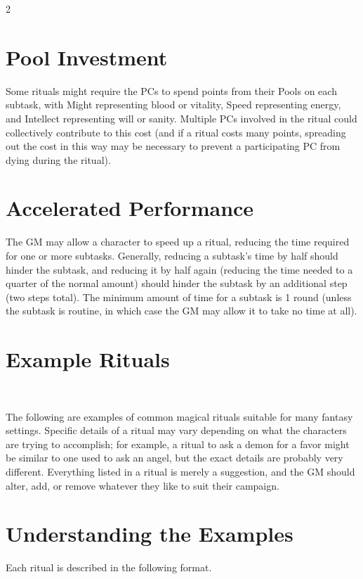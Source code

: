 \begin{multicols}{2}
\section{Pool Investment}

Some rituals might require the PCs to spend points from their Pools on each subtask, with Might representing blood or vitality, Speed representing energy, and Intellect representing will or sanity. Multiple PCs involved in the ritual could collectively contribute to this cost (and if a ritual costs many points, spreading out the cost in this way may be necessary to prevent a participating PC from dying during the ritual). 

\section{Accelerated Performance}

The GM may allow a character to speed up a ritual, reducing the time required for one or more subtasks. Generally, reducing a subtask’s time by half should hinder the subtask, and reducing it by half again (reducing the time needed to a quarter of the normal amount) should hinder the subtask by an additional step (two steps total). The minimum amount of time for a subtask is 1 round (unless the subtask is routine, in which case the GM may allow it to take no time at all).

\section{Example Rituals} 

The following are examples of common magical rituals suitable for many fantasy settings. Specific details of a ritual may vary depending on what the characters are trying to accomplish; for example, a ritual to ask a demon for a favor might be similar to one used to ask an angel, but the exact details are probably very different. Everything listed in a ritual is merely a suggestion, and the GM should alter, add, or remove whatever they like to suit their campaign.

\section{Understanding the Examples}

Each ritual is described in the following format. 


\end{multicols}
